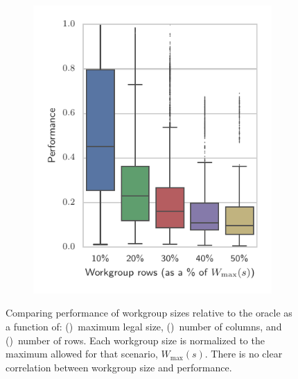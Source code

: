\documentclass[nonatbib,preprint,nocopyrightspace,9pt]{sigplanconf}
\begin{document}
\begin{figure}
\begin{subfigure}[h]{.48\columnwidth}
    \vspace{-1.5em} %
    \caption{}
    \label{fig:performance-wg-c}
  \end{subfigure}
  ~%
  \begin{subfigure}[h]{.48\columnwidth}
    \centering
    \includegraphics[width=\columnwidth]{img/performance_max_r}
    \vspace{-1.5em} %
    \caption{}
    \label{fig:performance-wg-r}
  \end{subfigure}
  \caption{%
    Comparing performance of workgroup sizes relative to the oracle as
    a function of: ()~maximum legal
    size, ()~number of columns, and
    ()~number of rows. Each workgroup
    size is normalized to the maximum allowed for that scenario,
    $W_{\max}(s)$. There is no clear correlation between workgroup
    size and performance.%
  }
  \label{fig:performance-wgsizes}
\end{figure}
\end{document}
